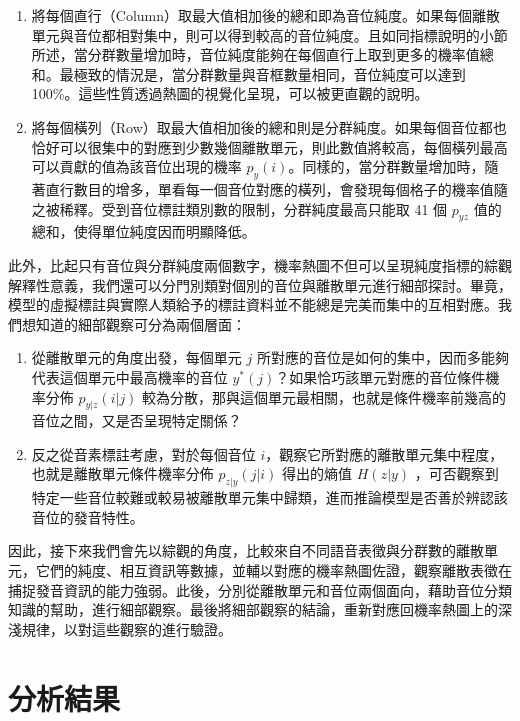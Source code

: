         \begin{enumerate}
            \item 將每個直行（Column）取最大值相加後的總和即為音位純度。如果每個離散單元與音位都相對集中，則可以得到較高的音位純度。且如同指標說明的小節所述，當分群數量增加時，音位純度能夠在每個直行上取到更多的機率值總和。最極致的情況是，當分群數量與音框數量相同，音位純度可以達到 100\%。這些性質透過熱圖的視覺化呈現，可以被更直觀的說明。

            \item 將每個橫列（Row）取最大值相加後的總和則是分群純度。如果每個音位都也恰好可以很集中的對應到少數幾個離散單元，則此數值將較高，每個橫列最高可以貢獻的值為該音位出現的機率 $p_{y}(i)$。同樣的，當分群數量增加時，隨著直行數目的增多，單看每一個音位對應的橫列，會發現每個格子的機率值隨之被稀釋。受到音位標註類別數的限制，分群純度最高只能取 41 個 $p_{yz}$ 值的總和，使得單位純度因而明顯降低。
        \end{enumerate}

        此外，比起只有音位與分群純度兩個數字，機率熱圖不但可以呈現純度指標的綜觀解釋性意義，我們還可以分門別類對個別的音位與離散單元進行細部探討。畢竟，模型的虛擬標註與實際人類給予的標註資料並不能總是完美而集中的互相對應。我們想知道的細部觀察可分為兩個層面：

        \begin{enumerate}
            \item 從離散單元的角度出發，每個單元 $j$ 所對應的音位是如何的集中，因而多能夠代表這個單元中最高機率的音位 $y^*(j)$？如果恰巧該單元對應的音位條件機率分佈 $p_{y|z}(i|j)$ 較為分散，那與這個單元最相關，也就是條件機率前幾高的音位之間，又是否呈現特定關係？
            \item 反之從音素標註考慮，對於每個音位 $i$，觀察它所對應的離散單元集中程度，也就是離散單元條件機率分佈 $p_{z|y}(j|i)$ 得出的熵值 $H(z|y)$ ，可否觀察到特定一些音位較難或較易被離散單元集中歸類，進而推論模型是否善於辨認該音位的發音特性。
        \end{enumerate}

        因此，接下來我們會先以綜觀的角度，比較來自不同語音表徵與分群數的離散單元，它們的純度、相互資訊等數據，並輔以對應的機率熱圖佐證，觀察離散表徵在捕捉發音資訊的能力強弱。此後，分別從離散單元和音位兩個面向，藉助音位分類知識的幫助，進行細部觀察。最後將細部觀察的結論，重新對應回機率熱圖上的深淺規律，以對這些觀察的進行驗證。

\section{分析結果}

